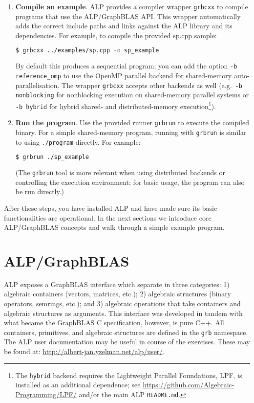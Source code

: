 \begin{enumerate}
\item \textbf{Compile an example}. ALP provides a compiler wrapper \texttt{grbcxx} to compile programs that use the ALP/GraphBLAS API. This wrapper automatically adds the correct include paths and links against the ALP library and its dependencies. For example, to compile the provided sp.cpp sample:
\begin{lstlisting}[language=bash]
$ grbcxx ../examples/sp.cpp -o sp_example
\end{lstlisting}
By default this produces a sequential program; you can add the option \texttt{-b reference\_omp} to use the OpenMP parallel backend for shared-memory auto-parallelisation. The wrapper \texttt{grbcxx} accepts other backends as well (e.g.\ \texttt{-b nonblocking} for nonblocking execution on shared-memory parallel systems or \texttt{-b hybrid} for hybrid shared- and distributed-memory execution\footnote{The \texttt{hybrid} backend requires the Lightweight Parallel Foundations, LPF, is installed as an additional dependence; see \url{https://github.com/Algebraic-Programming/LPF/} and/or the main ALP \texttt{README.md}.}).

\item \textbf{Run the program}. Use the provided runner \texttt{grbrun} to execute the compiled binary. For a simple shared-memory program, running with \texttt{grbrun} is similar to using \texttt{./program} directly. For example:
\begin{lstlisting}[language=bash]
$ grbrun ./sp_example
\end{lstlisting}
(The \texttt{grbrun} tool is more relevant when using distributed backends or controlling the execution environment; for basic usage, the program can also be run directly.)
\end{enumerate}
After these steps, you have installed ALP and have made sure its basic functionalities are operational. In the next sections we introduce core ALP/GraphBLAS concepts and walk through a simple example program.

\section{ALP/GraphBLAS}\label{sec:alp_concepts}

ALP exposes a GraphBLAS interface which separate in three categories: 1) algebraic containers (vectors, matrices, etc.); 2) algebraic structures (binary operators, semrings, etc.); and 3) algebraic operations that take containers and algebraic structures as arguments. This interface was developed in tandem with what became the GraphBLAS C specification, however, is pure C++. All containers, primitives, and algebraic structures are defined in the \texttt{grb} namespace. The ALP user documentation may be useful in course of the exercises. These may be found at: \url{http://albert-jan.yzelman.net/alp/user/}.

